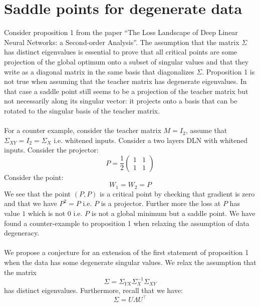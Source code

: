 \documentclass{article}
\theoremstyle{definition}
\begin{document}
\section{Saddle points for degenerate data}
Consider proposition 1 from the paper ``The Loss Landscape of Deep Linear Neural Networks: a Second-order Analysis''. The assumption that the matrix $\Sigma$ has distinct eigenvalues is essential to prove that all critical points are some projection of the global optimum onto a subset of singular values and that they write as a diagonal matrix in the same basis that diagonalizes $\Sigma$. Proposition 1 is not true when assuming that the teacher matrix has degenerate eigenvalues. In that case a saddle point still seems to be a projection of the teacher matrix but not necessarily along its singular vector: it projects onto a basis that can be rotated to the singular basis of the teacher matrix.
\\
\\
For a counter example, consider the teacher matrix $M=I_2$, assume that $\Sigma_{XY} = I_2 = \Sigma_X$ i.e. whitened inputs. Consider a two layers DLN with whitened inputs. Consider the projector:
\begin{equation*}
    P = \frac{1}{2}\begin{pmatrix}
        1 & 1\\
        1 & 1
    \end{pmatrix}
\end{equation*}
Consider the point:
\begin{equation*}
    W_1 = W_2 = P
\end{equation*}
We see that the point $(P,P)$ is a critical point by checking that gradient is zero and that we have $P^2 = P$ i.e. $P$ is a projector. Further more the loss at $P$ has value $1$ which is not $0$ i.e. $P$ is not a global minimum but a saddle point. We have found a counter-example to proposition 1 when relaxing the assumption of data degeneracy.
\\
\\
We propose a conjecture for an extension of the first statement of proposition 1 when the data has some degenerate singular values. We relax the assumption that the matrix
\begin{equation*}
    \Sigma = \Sigma_{YX}\Sigma_X^{-1}\Sigma_{XY}
\end{equation*}
has distinct eigenvalues. Furthermore, recall that we have:
\begin{equation*}
    \Sigma = U\Lambda U^{\top}
\end{equation*}
\end{document}

